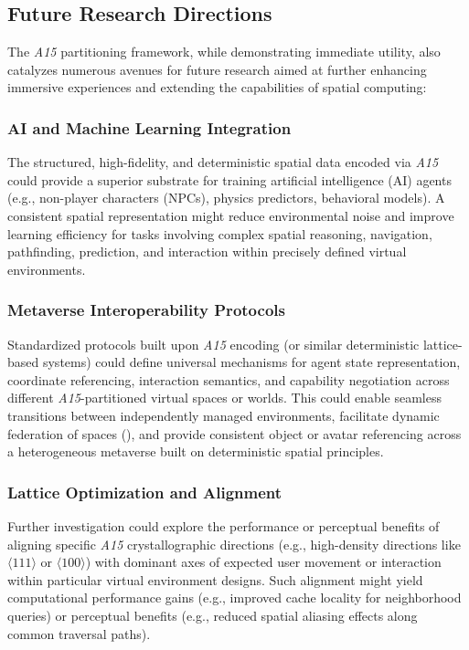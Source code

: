 \documentclass[10pt]{article}
\def\AAAB{\textit{A15}}
\begin{document}
\subsection{Future Research Directions}\label{subsec:outlook-research}

The \AAAB{} partitioning framework, while demonstrating immediate utility, also catalyzes numerous avenues for future research aimed at further enhancing immersive experiences and extending the capabilities of spatial computing:

\subsubsection{AI and Machine Learning Integration}\label{subsubsec:outlook-ai-ml}
The structured, high-fidelity, and deterministic spatial data encoded via \AAAB{} could provide a superior substrate for training artificial intelligence (AI) agents (e.g., non-player characters (NPCs), physics predictors, behavioral models). A consistent spatial representation might reduce environmental noise and improve learning efficiency for tasks involving complex spatial reasoning, navigation, pathfinding, prediction, and interaction within precisely defined virtual environments.

\subsubsection{Metaverse Interoperability Protocols}\label{subsubsec:outlook-interop}
Standardized protocols built upon \AAAB{} encoding (or similar deterministic lattice-based systems) could define universal mechanisms for agent state representation, coordinate referencing, interaction semantics, and capability negotiation across different \AAAB{}-partitioned virtual spaces or worlds. This could enable seamless transitions between independently managed environments, facilitate dynamic federation of spaces (), and provide consistent object or avatar referencing across a heterogeneous metaverse built on deterministic spatial principles.

\subsubsection{Lattice Optimization and Alignment}\label{subsubsec:outlook-lattice}
Further investigation could explore the performance or perceptual benefits of aligning specific \AAAB{} crystallographic directions (e.g., high-density directions like $\langle 111 \rangle$ or $\langle 100 \rangle$) with dominant axes of expected user movement or interaction within particular virtual environment designs. Such alignment might yield computational performance gains (e.g., improved cache locality for neighborhood queries) or perceptual benefits (e.g., reduced spatial aliasing effects along common traversal paths).
\end{document}
